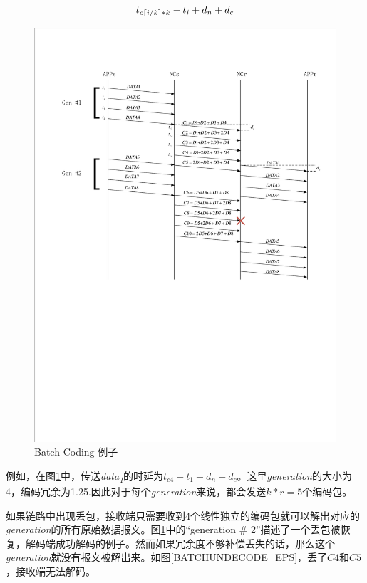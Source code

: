 \begin{equation}\label{eq26}
{t_{c\left\lceil {{i \mathord{\left/
					{\vphantom {i k}} \right.
					\kern-\nulldelimiterspace} k}} \right\rceil *k}} - {t_i} + {d_n} + {d_c}
\end{equation}
\begin{figure}[htbp]
	\centering
	\includegraphics[width=6in]{figures/batch.pdf}
	\caption{Batch Coding 例子}
	\label{BATCHCODING_EPS}
\end{figure}
例如，在图\ref{BATCHCODING_EPS}中，传送\emph{data\textsubscript{1}}的时延为$t_{c4}-t_{1}+d_{n}+d_{c}$。这里\emph{generation}的大小为4，编码冗余为1.25.因此对于每个\emph{generation}来说，都会发送$k*r=5$个编码包。
\par
如果链路中出现丢包，接收端只需要收到4个线性独立的编码包就可以解出对应的\emph{generation}的所有原始数据报文。图\ref{BATCHCODING_EPS}中的“generation \# 2”描述了一个丢包被恢复，解码端成功解码的例子。然而如果冗余度不够补偿丢失的话，那么这个\emph{generation}就没有报文被解出来。如图\ref{BATCHUNDECODE_EPS}，丢了$C4$和$C5$，接收端无法解码。
